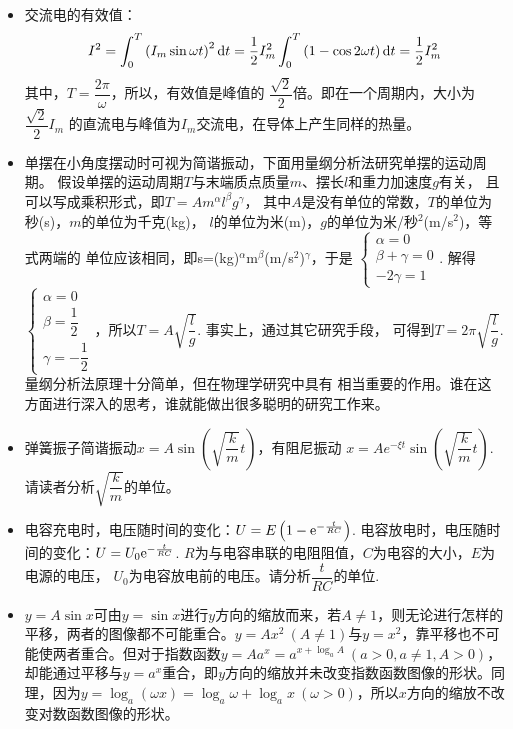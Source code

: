 \begin{itemize}[leftmargin=\inteval{\myitemleftmargin}pt,itemsep=
   \inteval{\myitemitempsep}pt,topsep=\inteval{\myitemtopsep}pt]
\item 交流电的有效值：
\begin{gather*}
I^2=\int_{0}^{T}\left( I_m\sin \omega t\right)^2 \mathrm{d} t
=\dfrac{1}{2}I_m^2 \int_{0}^{T}\left( 1-\cos 2\omega t\right) \mathrm{d} t
=\dfrac{1}{2}I_m^2
\end{gather*}
其中，$ T=\dfrac{2\pi}{\omega} $，所以，有效值是峰值的
$ \dfrac{\sqrt{2}}{2} $倍。即在一个周期内，大小为$ \dfrac{\sqrt{2}}{2}I_m $
的直流电与峰值为$ I_m $交流电，在导体上产生同样的热量。

\item 单摆在小角度摆动时可视为简谐振动，下面用量纲分析法研究单摆的运动周期。
假设单摆的运动周期$ T $与末端质点质量$ m $、摆长$ l $和重力加速度$ g $有关，
且可以写成乘积形式，即$ T=Am^{\alpha}l^{\beta}g^{\gamma} $，
其中$ A $是没有单位的常数，$ T $的单位为秒(s)，$ m $的单位为千克(kg)，
$ l $的单位为米(m)，$ g $的单位为米/秒$ ^2 $(m/s$ ^2 $)，等式两端的
单位应该相同，即s=(kg)$ ^\alpha $m$ ^\beta $(m/s$ ^2 $)$ ^\gamma $，于是
$ \begin{cases}
    \alpha=0 \\
    \beta+\gamma =0 \\
    -2\gamma =1
\end{cases} $. 解得
$ \begin{cases}
    \alpha=0 \\
    \beta=\dfrac{1}{2} \\
    \gamma =-\dfrac{1}{2}
\end{cases} $，所以$ T=A\sqrt{\dfrac{l}{g}} $. 事实上，通过其它研究手段，
可得到$ T=2\pi \sqrt{\dfrac{l}{g}} $. 量纲分析法原理十分简单，但在物理学研究中具有
相当重要的作用。谁在这方面进行深入的思考，谁就能做出很多聪明的研究工作来。

\item 弹簧振子简谐振动$ x=A\sin\left( \sqrt{\dfrac{k}{m}}t\right) $，有阻尼振动
$ x=Ae^{-\xi t}\sin\left( \sqrt{\dfrac{k}{m}}t\right) $. 
请读者分析$ \sqrt{\dfrac{k}{m}} $的单位。

\item 电容充电时，电压随时间的变化：$ U=E\left(1-\mathrm{e}^{-\frac{t}{RC}} \right) $. 
电容放电时，电压随时间的变化：$ U=U_0\mathrm{e}^{-\frac{t}{RC}}$.
$ R $为与电容串联的电阻阻值，$ C $为电容的大小，$ E $为电源的电压，
$ U_0 $为电容放电前的电压。请分析$ \dfrac{t}{RC} $的单位.

\item $ y=A\sin x $可由$ y=\sin x $进行$ y $方向的缩放而来，若$ A\neq 1 $，则无论进行怎样的平移，两者的图像都不可能重合。$ y=Ax^2\ (A\neq 1) $与$ y=x^2 $，靠平移也不可能使两者重合。但对于指数函数$ y=Aa^x=a^{x+\log_a A}\ (a>0,a\neq 1,A>0) $，却能通过平移与$ y=a^x $重合，即$ y $方向的缩放并未改变指数函数图像的形状。同理，因为$ y=\log_a(\omega x)=\log_a \omega+\log_a x \ (\omega>0) $，所以$ x $方向的缩放不改变对数函数图像的形状。


\end{itemize}
